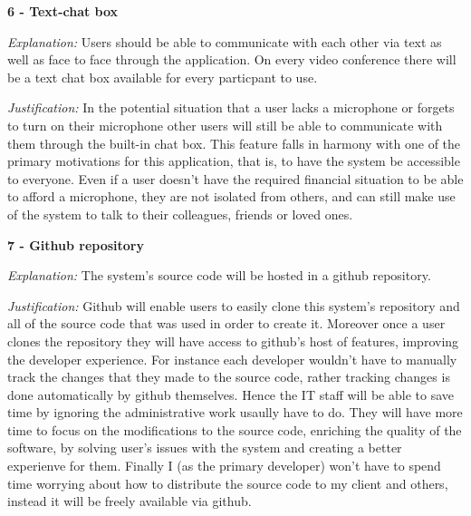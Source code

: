 \textsf{\bfseries 6 - Text-chat box} \\ \vspace{0.1cm}

\textit{Explanation:}
Users should be able to communicate with each other via text
as well as face to face through the application. On every
video conference there will be a text chat box available for
every particpant to use. \vspace{0.1cm}

\textit{Justification:}
In the potential situation that a user
lacks a microphone or forgets to turn on their microphone other 
users will still be able to communicate with them through the 
built-in chat box. This feature falls in harmony with one of 
the primary motivations for this application, that is, to have 
the system be accessible to everyone. Even if a user doesn't
have the required financial situation to be able to afford a 
microphone, they are not isolated from others, and can still 
make use of the system to talk to their colleagues, friends
or loved ones. \vspace{0.2cm}

\textsf{\bfseries 7 - Github repository} \\ \vspace{0.1cm}

\textit{Explanation:}
The system's source code will be hosted in a github
repository.
\vspace{0.1cm}

\textit{Justification:} 
Github will enable users to easily clone this system's repository
and all of the source code that was used in order to create it. 
Moreover once a user clones the repository they will have access
to github's host of features, improving the developer experience.
For instance each developer wouldn't have to manually track the 
changes that they made to the source code, rather tracking changes
is done automatically by github themselves. Hence the IT staff 
will be able to save time by ignoring the administrative work 
usaully have to do. They will have more time to focus on 
the modifications to the source code, enriching the quality of 
the software, by solving user's issues with the system and 
creating a better experienve for them. Finally I
(as the primary developer) won't 
have to spend time worrying about how to distribute the source
code to my client and others, instead it will be freely
available via github.\\ \vspace{0.2cm}

